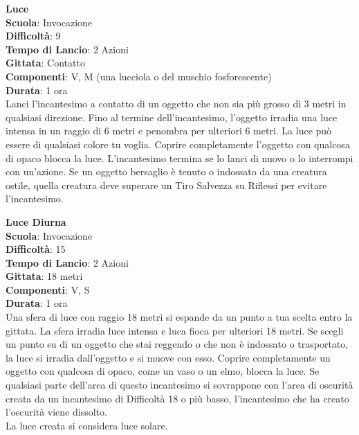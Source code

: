 \begin{multicols}{2}
\medskip\textbf{Luce}\\
\textbf{Scuola}: Invocazione\\
\textbf{Difficoltà}: 9\\
\textbf{Tempo di Lancio}: 2 Azioni\\
\textbf{Gittata}: Contatto\\
\textbf{Componenti}: V, M (una lucciola o del muschio fosforescente)\\
\textbf{Durata}: 1 ora\\
Lanci l'incantesimo a contatto di un oggetto che non sia più grosso di 3 metri in qualsiasi direzione. Fino al termine dell'incantesimo, l'oggetto irradia una luce intensa in un raggio di 6 metri e penombra per ulteriori 6 metri. La luce può essere di qualsiasi colore tu voglia. Coprire completamente l'oggetto con qualcosa di opaco blocca la luce. L'incantesimo termina se lo lanci di nuovo o lo interrompi con un'azione. Se un oggetto bersaglio è tenuto o indossato da una creatura ostile, quella creatura deve superare un Tiro Salvezza su Riflessi per evitare l'incantesimo. 

\medskip\textbf{Luce Diurna}\\
\textbf{Scuola}: Invocazione\\
\textbf{Difficoltà}: 15\\
\textbf{Tempo di Lancio}: 2 Azioni\\
\textbf{Gittata}: 18 metri\\
\textbf{Componenti}: V, S\\
\textbf{Durata}: 1 ora\\
Una sfera di luce con raggio 18 metri si espande da un punto a tua scelta entro la gittata. La sfera irradia luce intensa e luca fioca per ulteriori 18 metri. Se scegli un punto su di un oggetto che stai reggendo o che non è indossato o trasportato, la luce si irradia dall'oggetto e si muove con esso. Coprire completamente un oggetto con qualcosa di opaco, come un vaso o un elmo, blocca la luce. Se qualsiasi parte dell'area di questo incantesimo si sovrappone con l'area di oscurità creata da un incantesimo di Difficoltà 18 o più basso, l'incantesimo che ha creato l'oscurità viene dissolto.\\
La luce creata si considera luce solare.


\end{multicols}

